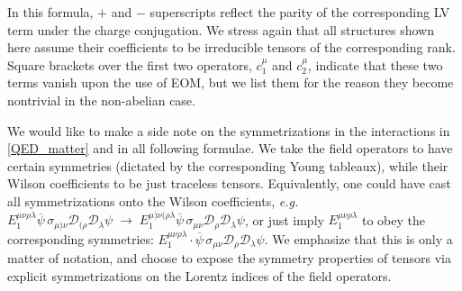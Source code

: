 \documentclass[12pt,preprintnumbers,nofootinbib]{revtex4}
\newcommand{\wt}{\widetilde}
\newcommand{\ov}{\overline}
\begin{document}
	In this formula,  $+$ and $-$ superscripts reflect
	the parity of the corresponding LV term under the charge conjugation.
	We stress again that all structures shown here assume
	their coefficients to be  irreducible tensors of the 
	corresponding rank. 
	Square brackets over the first two operators, $ c_1^\mu $ and $ c_2^\mu $, 
indicate that these two terms vanish upon the use of EOM, but we list them 
	for the reason they become nontrivial in the non-abelian case.

	We would like to make a side note on the symmetrizations in the 
	interactions in \eqref{QED_matter} and in all following formulae.
	We take the field operators to have certain symmetries 
	(dictated by the corresponding Young tableaux), while their Wilson
	coefficients to be just traceless tensors. 
	Equivalently, one could have cast all symmetrizations onto the
	Wilson coefficients, {\it e.g.}
$	E_1^{\mu\nu\rho\lambda}
	\ov{\psi}\, \sigma_{\mu)\nu} \mathcal{D}_{(\rho}\mathcal{D}_\lambda 
	\psi 
	\;\to\;
	E_1^{\mu)\nu(\rho\lambda}
	\ov{\psi}\, \sigma_{\mu\nu} \mathcal{D}_{\rho}\mathcal{D}_\lambda 
	\psi $,
	or just imply $ E_1^{\mu\nu\rho\lambda} $ to obey the corresponding
	symmetries: 
$	E_1^{\mu\nu\rho\lambda}\cdot
	\ov{\psi}\, \sigma_{\mu\nu} \mathcal{D}_{\rho}\mathcal{D}_\lambda 
	\psi $.
	We emphasize that this is only a matter of notation, and choose
	to expose the symmetry properties of tensors via explicit 
	symmetrizations on the Lorentz indices of the field operators.

\end{document}
